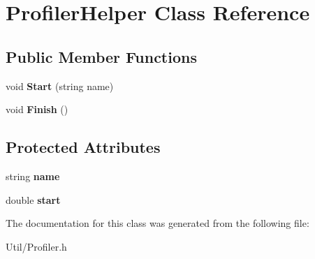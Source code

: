 \hypertarget{class_profiler_helper}{
\section{\-Profiler\-Helper \-Class \-Reference}
\label{class_profiler_helper}
}
\subsection*{\-Public \-Member \-Functions}
\begin{DoxyCompactItemize}
\item 
\hypertarget{class_profiler_helper_a08d89456f48b8d2e4b5239dcfa7527a1}{
void {\bfseries \-Start} (string name)}
\label{class_profiler_helper_a08d89456f48b8d2e4b5239dcfa7527a1}

\item 
\hypertarget{class_profiler_helper_a5e125e2c8280418c539269438e97568a}{
void {\bfseries \-Finish} ()}
\label{class_profiler_helper_a5e125e2c8280418c539269438e97568a}

\end{DoxyCompactItemize}
\subsection*{\-Protected \-Attributes}
\begin{DoxyCompactItemize}
\item 
\hypertarget{class_profiler_helper_a6676fb76738693e3c0cb628ca43de7f1}{
string {\bfseries name}}
\label{class_profiler_helper_a6676fb76738693e3c0cb628ca43de7f1}

\item 
\hypertarget{class_profiler_helper_a624a70218836e1560374ba9dc386624a}{
double {\bfseries start}}
\label{class_profiler_helper_a624a70218836e1560374ba9dc386624a}

\end{DoxyCompactItemize}


\-The documentation for this class was generated from the following file\-:\begin{DoxyCompactItemize}
\item 
\-Util/\-Profiler.\-h\end{DoxyCompactItemize}
